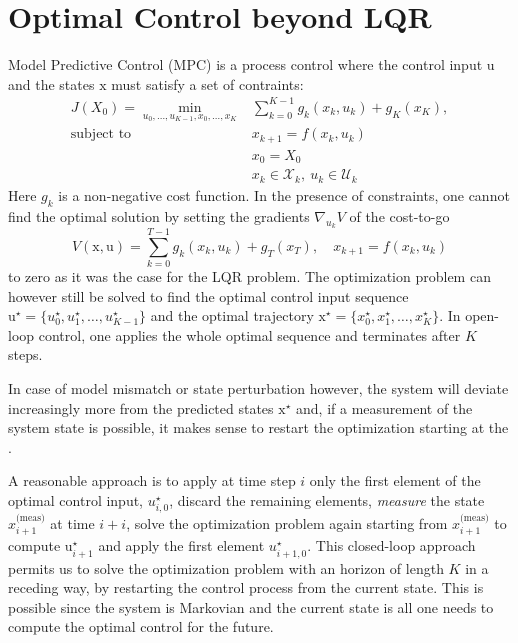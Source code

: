 \documentclass[11pt]{report}
\newcommand{\bs}[1]{\boldsymbol{#1}}
\newcommand{\bsu}{\bs{\mathrm{u}}}
\newcommand{\bsx}{\bs{\mathrm{x}}}
\begin{document}
\chapter{Optimal Control beyond LQR}
\label{sec:optimal-control-beyond-lqr}

Model Predictive Control (MPC) is a process control where the control input $\bsu$ and the states $\bsx$ must satisfy a set of contraints:
\begin{equation}
  \label{eq:MPC-general-formulation}
  \begin{aligned}
    J(X_0) = \min_{u_0,\ldots,u_{K-1}, x_0,\ldots,x_K} &\sum_{k=0}^{K-1} g_k(x_k,u_k) + g_K(x_K),\\
    \text{subject to } & x_{k+1} = f(x_k,u_k) \\
                                                       & x_0 = X_0 \\
                                                       & x_k \in \mathcal{X}_k,\ u_k \in \mathcal{U}_k
  \end{aligned}
\end{equation}
Here $g_k$ is a non-negative cost function. In the presence of constraints, one cannot find the optimal solution by setting the gradients $\nabla_{u_k} V$ of the cost-to-go
\begin{equation*}
  V(\bsx,\bsu) = \sum_{k=0}^{T-1} g_k(x_k,u_k) + g_T(x_T),\quad x_{k+1} = f(x_k,u_k)
\end{equation*}
to zero as it was the case for the LQR problem. The optimization problem can however still be solved to find the optimal control input sequence $\bsu^\star = \{u_0^\star,u_1^\star,\ldots,u_{K-1}^\star\}$ and the optimal trajectory $\bsx^\star = \{x_0^\star,x_1^\star,\ldots,x_K^\star\}$. In open-loop control, one applies the whole optimal sequence and terminates after $K$ steps.

In case of model mismatch or state perturbation however, the system will deviate increasingly more from the predicted states $\bsx^\star$ and, if a measurement of the system state is possible, it makes sense
to restart the optimization starting at the .

A reasonable approach is to apply at time step $i$ only the first element of the optimal control input, $u_{i,0}^\star$, discard the remaining elements, \emph{measure} the state $x_{i+1}^\text{(meas)}$ at time $i+i$, solve the optimization problem again starting from $x_{i+1}^\text{(meas)}$ to compute $\bsu_{i+1}^\star$ and apply the first element $u_{i+1,0}^\star$. This closed-loop approach permits us to solve the optimization problem with an horizon of length $K$ in a receding way, by restarting the control process from the current state. This is possible since the system is Markovian and the current state is all one needs to compute the optimal control for the future.
\end{document}
